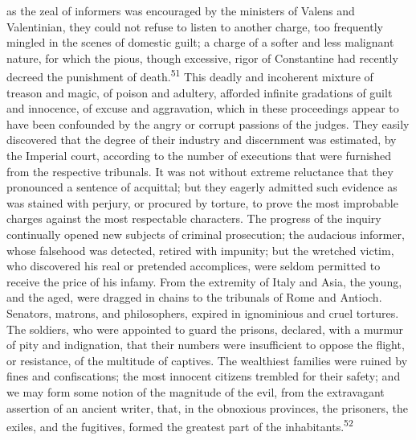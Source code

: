 as the zeal of informers was encouraged by the ministers of
Valens and Valentinian, they could not refuse to listen to
another charge, too frequently mingled in the scenes of domestic
guilt; a charge of a softer and less malignant nature, for which
the pious, though excessive, rigor of Constantine had recently
decreed the punishment of death.\textsuperscript{51} This deadly and incoherent
mixture of treason and magic, of poison and adultery, afforded
infinite gradations of guilt and innocence, of excuse and
aggravation, which in these proceedings appear to have been
confounded by the angry or corrupt passions of the judges. They
easily discovered that the degree of their industry and
discernment was estimated, by the Imperial court, according to
the number of executions that were furnished from the respective
tribunals. It was not without extreme reluctance that they
pronounced a sentence of acquittal; but they eagerly admitted
such evidence as was stained with perjury, or procured by
torture, to prove the most improbable charges against the most
respectable characters. The progress of the inquiry continually
opened new subjects of criminal prosecution; the audacious
informer, whose falsehood was detected, retired with impunity;
but the wretched victim, who discovered his real or pretended
accomplices, were seldom permitted to receive the price of his
infamy. From the extremity of Italy and Asia, the young, and the
aged, were dragged in chains to the tribunals of Rome and
Antioch. Senators, matrons, and philosophers, expired in
ignominious and cruel tortures. The soldiers, who were appointed
to guard the prisons, declared, with a murmur of pity and
indignation, that their numbers were insufficient to oppose the
flight, or resistance, of the multitude of captives. The
wealthiest families were ruined by fines and confiscations; the
most innocent citizens trembled for their safety; and we may form
some notion of the magnitude of the evil, from the extravagant
assertion of an ancient writer, that, in the obnoxious provinces,
the prisoners, the exiles, and the fugitives, formed the greatest
part of the inhabitants.\textsuperscript{52}


